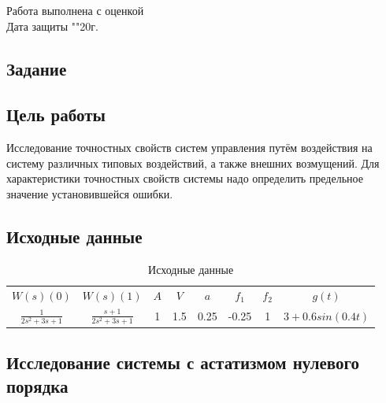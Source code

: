 \documentclass[a4paper, 11pt]{article}
\begin{document}
\begin{titlepage}
		Работа выполнена с оценкой \hspace{1cm} \underline{\hspace{8cm}} \\ 
		\vspace{1cm}
		Дата защиты "\underline{\hspace{0.7cm}}"\hspace{0.2cm}\underline{\hspace{2cm}}\hspace{0.2cm}20\underline{\hspace{0.7cm}}г.

\end{titlepage}

\begin{center}
\section*{Задание}
\end{center}
\subsection*{Цель работы}
Исследование точностных свойств систем управления путём воздействия на систему различных типовых воздействий, а также внешних возмущений. Для характеристики точностных свойств системы надо определить предельное значение установившейся ошибки.


\subsection*{Исходные данные}
\begin{table}[h!]
\centering
\begin{threeparttable}
\caption{Исходные данные}\label{tab:perflogcross}
\begin{tabular}{|c|c|c|c|c|c|c|c|}
\hline
$W(s)(0)$ & $W(s)(1)$ & $A$ & $V$ & $a$ & $f_1$ & $f_2$ & $g(t)$\\
\cline{1-8}
\rule{0cm}{0.75cm}
\(\displaystyle \frac{1}{2s^2+3s+1}\) & \(\displaystyle \frac{s+1}{2s^2+3s+1}\) & 1 & 1.5 & 0.25 & -0.25 & 1 & $3+0.6sin(0.4t)$\\[0.4cm]
\hline

\end{tabular}
\end{threeparttable}
\end{table}

\newpage
\begin{center}
\section{Исследование системы с астатизмом нулевого порядка}
\end{center}
\end{document}
